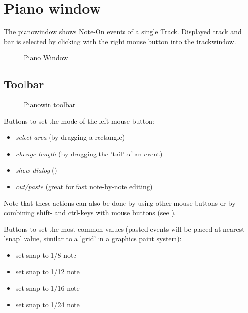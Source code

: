 \documentclass[letterpaper]{report}
\begin{document}

\chapter{Piano window}\label{pianowin}

The pianowindow shows Note-On events of a single Track.
Displayed track and bar is selected by clicking with the right
mouse button into the trackwindow.

\begin{figure}%
%
%
\caption{Piano Window}%
\end{figure}



\section{Toolbar}\label{pwtoolbar}

\begin{figure}%
%
%
\caption{Pianowin toolbar}%
\end{figure}

Buttons to set the mode of the left mouse-button:
\begin{itemize}
\item {\em select area} (by dragging a rectangle)
\item {\em change length} (by dragging the 'tail' of an event)
\item {\em show dialog} ()
\item {\em cut/paste} (great for fast note-by-note editing)
\end{itemize}

Note that these actions can also be done by using other mouse buttons or
by combining shift- and ctrl-keys with mouse buttons
(see ).


Buttons to set the most common  values (pasted events
will be placed at nearest 'snap' value, similar to a 'grid' in a graphics
paint system):
\begin{itemize}
\item set snap to 1/8 note
\item set snap to 1/12 note
\item set snap to 1/16 note
\item set snap to 1/24 note
\end{itemize}
\end{document}
